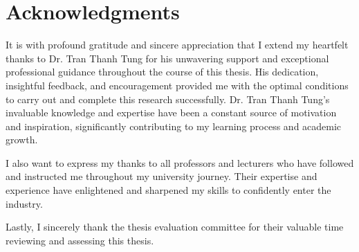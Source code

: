 \documentclass[12pt, twoside]{report}
\begin{document}
\begin{titlepage}
	\hspace{7cm}
	\makebox[7cm][l]{\underline{\hspace{7cm}}}
	\par \hspace{7cm}
	\par
	\vspace{2cm}
			
	\hspace{7cm}
	\makebox[7cm][l]{\underline{\hspace{7cm}}}
	\par \hspace{7cm}
	\par
	\vspace{0.75cm}
														
	\hspace{7cm}
	\par
	\thispagestyle{empty}
\end{titlepage}
\restoregeometry
	
\chapter*{Acknowledgments}
\hspace{1cm}It is with profound gratitude and sincere appreciation that I extend my heartfelt thanks to Dr. Tran Thanh Tung for his unwavering support and exceptional professional guidance throughout the course of this thesis. His dedication, insightful feedback, and encouragement provided me with the optimal conditions to carry out and complete this research successfully. Dr. Tran Thanh Tung's invaluable knowledge and expertise have been a constant source of motivation and inspiration, significantly contributing to my learning process and academic growth.

\hspace{0.5cm}I also want to express my thanks to all professors and lecturers who have followed and instructed me throughout my university journey. Their expertise and experience have enlightened and sharpened my skills to confidently enter the industry.

\hspace{0.5cm}Lastly, I sincerely thank the thesis evaluation committee for their valuable time reviewing and assessing this thesis.

\thispagestyle{empty}
\end{document}
